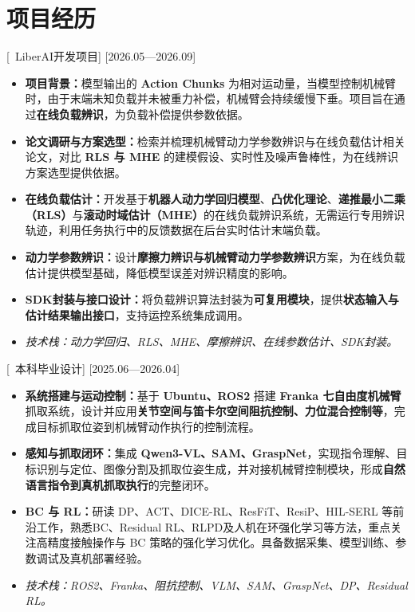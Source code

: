 \documentclass{resume}
\begin{document}
\section{\textcolor{myblue}{项目经历}}

[\textcolor{deepred}{\ LiberAI开发项目}]
[2026.05—2026.09]

\begin{itemize}
  \item[] \textbf{项目背景：}模型输出的 \textbf{Action Chunks} 为相对运动量，当模型控制机械臂时，由于末端未知负载并未被重力补偿，机械臂会持续缓慢下垂。项目旨在通过\textbf{在线负载辨识}，为负载补偿提供参数依据。
  \item \textbf{论文调研与方案选型：}检索并梳理机械臂动力学参数辨识与在线负载估计相关论文，对比 \textbf{RLS 与 MHE} 的建模假设、实时性及噪声鲁棒性，为在线辨识方案选型提供依据。
  \item \textbf{在线负载估计：}开发基于\textbf{机器人动力学回归模型}、\textbf{凸优化理论}、\textbf{递推最小二乘（RLS）}与\textbf{滚动时域估计（MHE）}的在线负载辨识系统，无需运行专用辨识轨迹，利用任务执行中的反馈数据在后台实时估计末端负载。
  \item \textbf{动力学参数辨识：}设计\textbf{摩擦力辨识与机械臂动力学参数辨识}方案，为在线负载估计提供模型基础，降低模型误差对辨识精度的影响。
  \item \textbf{SDK封装与接口设计：}将负载辨识算法封装为\textbf{可复用模块}，提供\textbf{状态输入与估计结果输出接口}，支持运控系统集成调用。
  \item[] \textit{\textcolor{deepred}{技术栈：}动力学回归、RLS、MHE、摩擦辨识、在线参数估计、SDK封装。}
\end{itemize}

[\textcolor{deepred}{\ 本科毕业设计}]
[2025.06—2026.04]

\begin{itemize}
  \item \textbf{系统搭建与运动控制：}基于 \textbf{Ubuntu、ROS2} 搭建 \textbf{Franka 七自由度机械臂}抓取系统，设计并应用\textbf{关节空间与笛卡尔空间阻抗控制、力位混合控制等}，完成目标抓取位姿到机械臂动作执行的控制流程。
  \item \textbf{感知与抓取闭环：}集成 \textbf{Qwen3-VL、SAM、GraspNet}，实现指令理解、目标识别与定位、图像分割及抓取位姿生成，并对接机械臂控制模块，形成\textbf{自然语言指令到真机抓取执行}的完整闭环。
  \item \textbf{BC 与 RL：}研读 DP、ACT、DICE-RL、ResFiT、ResiP、HIL-SERL 等前沿工作，熟悉BC、Residual RL、RLPD及人机在环强化学习等方法，重点关注高精度接触操作与 BC 策略的强化学习优化。具备数据采集、模型训练、参数调试及真机部署经验。
  \item[] \textit{\textcolor{deepred}{技术栈：}ROS2、Franka、阻抗控制、VLM、SAM、GraspNet、DP、Residual RL。}
\end{itemize}
\end{document}
